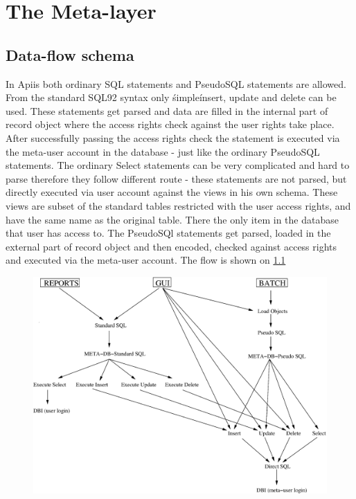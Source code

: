 \chapter{The Meta-layer}

\section{Data-flow schema}
In Apiis both ordinary SQL statements and PseudoSQL   statements are allowed. From the standard SQL92 syntax only \'simple\' insert, update and delete can be used. These statements get parsed and  data are filled in  the internal part of record object where the access rights check against the user rights take place. After successfully passing the access rights check the statement is executed via the meta-user account in the database - just like the ordinary PseudoSQL statements.\linebreak
The ordinary Select statements can be very complicated and hard to parse therefore they follow different route - these statements are not parsed, but directly executed via user account  against the views in his own schema. These views are subset of the standard tables restricted with the user access rights, and have the same name as the original table. There the only item in the database that user has access to.
\linebreak The PseudoSQl statements get parsed, loaded in the external part of record object and then encoded, checked against access rights and executed via the meta-user account.
The flow is shown on \ref{fig:meta1} 
\begin{figure}
   \centering
   \includegraphics[scale=0.5]{./meta-layer/meta1.eps}
   \caption{}
\label{fig:meta1}
\end{figure}
